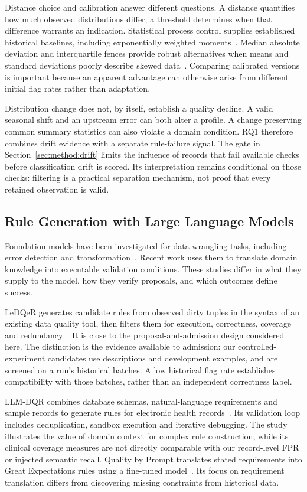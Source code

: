 Distance choice and calibration answer different questions. A distance quantifies how much observed distributions differ; a threshold determines when that difference warrants an indication. Statistical process control supplies established historical baselines, including exponentially weighted moments~\cite{Roberts1959}. Median absolute deviation and interquartile fences provide robust alternatives when means and standard deviations poorly describe skewed data~\cite{Leys2013,Tukey1977}. Comparing calibrated versions is important because an apparent advantage can otherwise arise from different initial flag rates rather than adaptation.

Distribution change does not, by itself, establish a quality decline. A valid seasonal shift and an upstream error can both alter a profile. A change preserving common summary statistics can also violate a domain condition. RQ1 therefore combines drift evidence with a separate rule-failure signal. The gate in Section~\ref{sec:method:drift} limits the influence of records that fail available checks before classification drift is scored. Its interpretation remains conditional on those checks: filtering is a practical separation mechanism, not proof that every retained observation is valid.

\subsection{Rule Generation with Large Language Models}

Foundation models have been investigated for data-wrangling tasks, including error detection and transformation~\cite{Narayan2022}. Recent work uses them to translate domain knowledge into executable validation conditions. These studies differ in what they supply to the model, how they verify proposals, and which outcomes define success.

LeDQeR generates candidate rules from observed dirty tuples in the syntax of an existing data quality tool, then filters them for execution, correctness, coverage and redundancy~\cite{Glock2026}. It is close to the proposal-and-admission design considered here. The distinction is the evidence available to admission: our controlled-experiment candidates use descriptions and development examples, and are screened on a run's historical batches. A low historical flag rate establishes compatibility with those batches, rather than an independent correctness label.

LLM-DQR combines database schemas, natural-language requirements and sample records to generate rules for electronic health records~\cite{Xie2025}. Its validation loop includes deduplication, sandbox execution and iterative debugging. The study illustrates the value of domain context for complex rule construction, while its clinical coverage measures are not directly comparable with our record-level FPR or injected semantic recall. Quality by Prompt translates stated requirements into Great Expectations rules using a fine-tuned model~\cite{Abughazala2026}. Its focus on requirement translation differs from discovering missing constraints from historical data.


